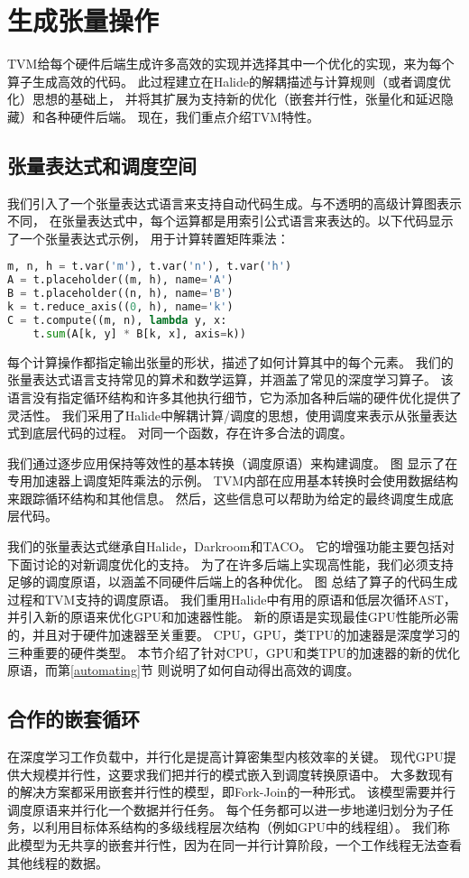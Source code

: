 \section{生成张量操作}
TVM给每个硬件后端生成许多高效的实现并选择其中一个优化的实现，来为每个算子生成高效的代码。
此过程建立在Halide的解耦描述与计算规则（或者调度优化）思想的基础上，
并将其扩展为支持新的优化（嵌套并行性，张量化和延迟隐藏）和各种硬件后端。
现在，我们重点介绍TVM特性。

\subsection{张量表达式和调度空间}
我们引入了一个张量表达式语言来支持自动代码生成。与不透明的高级计算图表示不同，
在张量表达式中，每个运算都是用索引公式语言来表达的。以下代码显示了一个张量表达式示例，
用于计算转置矩阵乘法：

\begin{lstlisting}[language={Python}]
m, n, h = t.var('m'), t.var('n'), t.var('h')
A = t.placeholder((m, h), name='A')
B = t.placeholder((n, h), name='B')
k = t.reduce_axis((0, h), name='k')
C = t.compute((m, n), lambda y, x:
    t.sum(A[k, y] * B[k, x], axis=k)) 
\end{lstlisting}

每个计算操作都指定输出张量的形状，描述了如何计算其中的每个元素。
我们的张量表达式语言支持常见的算术和数学运算，并涵盖了常见的深度学习算子。
该语言没有指定循环结构和许多其他执行细节，它为添加各种后端的硬件优化提供了灵活性。
我们采用了Halide中解耦计算/调度的思想，使用调度来表示从张量表达式到底层代码的过程。
对同一个函数，存在许多合法的调度。

我们通过逐步应用保持等效性的基本转换（调度原语）来构建调度。
图 显示了在专用加速器上调度矩阵乘法的示例。
TVM内部在应用基本转换时会使用数据结构来跟踪循环结构和其他信息。
然后，这些信息可以帮助为给定的最终调度生成底层代码。

我们的张量表达式继承自Halide，Darkroom和TACO。
它的增强功能主要包括对下面讨论的对新调度优化的支持。
为了在许多后端上实现高性能，我们必须支持足够的调度原语，以涵盖不同硬件后端上的各种优化。
图 总结了算子的代码生成过程和TVM支持的调度原语。
我们重用Halide中有用的原语和低层次循环AST，并引入新的原语来优化GPU和加速器性能。
新的原语是实现最佳GPU性能所必需的，并且对于硬件加速器至关重要。
CPU，GPU，类TPU的加速器是深度学习的三种重要的硬件类型。
本节介绍了针对CPU，GPU和类TPU的加速器的新的优化原语，而第\ref{automating}节
则说明了如何自动得出高效的调度。

\subsection{合作的嵌套循环}
在深度学习工作负载中，并行化是提高计算密集型内核效率的关键。
现代GPU提供大规模并行性，这要求我们把并行的模式嵌入到调度转换原语中。
大多数现有的解决方案都采用嵌套并行性的模型，即Fork-Join的一种形式。
该模型需要并行调度原语来并行化一个数据并行任务。
每个任务都可以进一步地递归划分为子任务，以利用目标体系结构的多级线程层次结构（例如GPU中的线程组）。
我们称此模型为无共享的嵌套并行性，因为在同一并行计算阶段，一个工作线程无法查看其他线程的数据。

